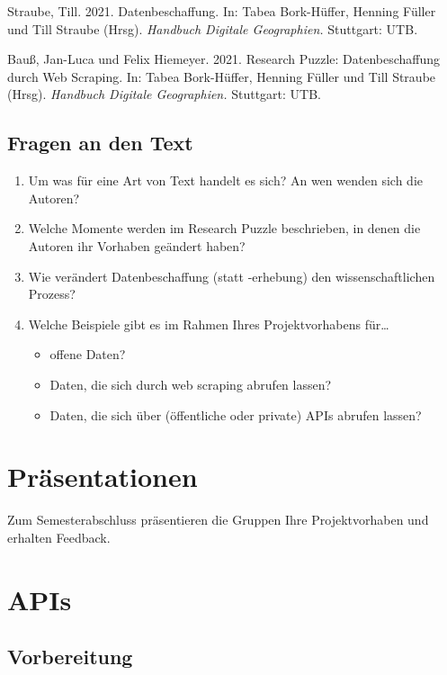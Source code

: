\documentclass[
  ngerman,
]{article}
\providecommand{\tightlist}{%
  \setlength{\itemsep}{0pt}\setlength{\parskip}{0pt}}
\begin{document}
Straube, Till. 2021. Datenbeschaffung. In: Tabea Bork-Hüffer, Henning Füller und Till Straube (Hrsg). \emph{Handbuch Digitale Geographien.} Stuttgart: UTB.

Bauß, Jan-Luca und Felix Hiemeyer. 2021. Research Puzzle: Datenbeschaffung durch Web Scraping. In: Tabea Bork-Hüffer, Henning Füller und Till Straube (Hrsg). \emph{Handbuch Digitale Geographien.} Stuttgart: UTB.

\hypertarget{fragen-an-den-text-3}{%
\subsection{Fragen an den Text}\label{fragen-an-den-text-3}}

\begin{enumerate}
\def\labelenumi{\arabic{enumi}.}
\tightlist
\item
  Um was für eine Art von Text handelt es sich? An wen wenden sich die Autoren?
\item
  Welche Momente werden im Research Puzzle beschrieben, in denen die Autoren ihr Vorhaben geändert haben?
\item
  Wie verändert Datenbeschaffung (statt -erhebung) den wissenschaftlichen Prozess?
\item
  Welche Beispiele gibt es im Rahmen Ihres Projektvorhabens für\ldots{}

  \begin{itemize}
  \tightlist
  \item
    offene Daten?
  \item
    Daten, die sich durch web scraping abrufen lassen?
  \item
    Daten, die sich über (öffentliche oder private) APIs abrufen lassen?
  \end{itemize}
\end{enumerate}

\hypertarget{pruxe4sentationen}{%
\section{Präsentationen}\label{pruxe4sentationen}}

Zum Semesterabschluss präsentieren die Gruppen Ihre Projektvorhaben und erhalten Feedback.

\hypertarget{apis}{%
\section{APIs}\label{apis}}

\hypertarget{vorbereitung-4}{%
\subsection{Vorbereitung}\label{vorbereitung-4}}
\end{document}
